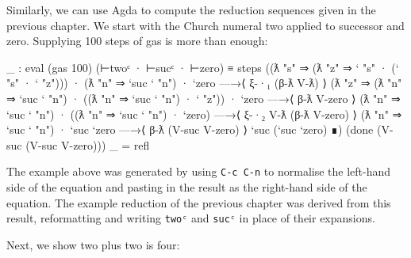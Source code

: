 Similarly, we can use Agda to compute the reduction sequences given in
the previous chapter. We start with the Church numeral two applied to
successor and zero. Supplying 100 steps of gas is more than enough:

\begin{fence}
\begin{code}
_ : eval (gas 100) (⊢twoᶜ · ⊢sucᶜ · ⊢zero) ≡
  steps
   ((ƛ "s" ⇒ (ƛ "z" ⇒ ` "s" · (` "s" · ` "z"))) · (ƛ "n" ⇒ `suc ` "n")
   · `zero
   —→⟨ ξ-·₁ (β-ƛ V-ƛ) ⟩
    (ƛ "z" ⇒ (ƛ "n" ⇒ `suc ` "n") · ((ƛ "n" ⇒ `suc ` "n") · ` "z")) ·
     `zero
   —→⟨ β-ƛ V-zero ⟩
    (ƛ "n" ⇒ `suc ` "n") · ((ƛ "n" ⇒ `suc ` "n") · `zero)
   —→⟨ ξ-·₂ V-ƛ (β-ƛ V-zero) ⟩
    (ƛ "n" ⇒ `suc ` "n") · `suc `zero
   —→⟨ β-ƛ (V-suc V-zero) ⟩
    `suc (`suc `zero)
   ∎)
   (done (V-suc (V-suc V-zero)))
_ = refl
\end{code}
\end{fence}

The example above was generated by using \texttt{C-c\ C-n} to normalise
the left-hand side of the equation and pasting in the result as the
right-hand side of the equation. The example reduction of the previous
chapter was derived from this result, reformatting and writing
\texttt{twoᶜ} and \texttt{sucᶜ} in place of their expansions.

Next, we show two plus two is four:


